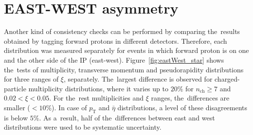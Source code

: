 \section{EAST-WEST asymmetry}\label{section:star_eastWest}
Another kind of consistency checks can be performed by comparing the~results obtained by tagging forward protons in different detectors.
Therefore, each distribution was measured separately for events in which forward proton
is on one and the other side of the IP (east-west). 
Figure~\ref{fig:eastWest_star} shows the~tests of multiplicity, transverse momentum and pseudorapidity distributions for three ranges of $\xi$, separately.
The~largest difference is observed for charged-particle multiplicity distributions, where it varies up to $20\%$ for $n_\textrm{ch}\geq 7$ and $0.02 < \xi < 0.05$. 
For the~rest multiplicities and $\xi$ ranges, the~differences are smaller ($<10\%$). In case of $p_\textrm{T}$ and $\bar{\eta}$ distributions, a level of  these disagreements is  below $5\%$. As a~result,
half of the~differences between east and west distributions were used to be  systematic uncertainty.


